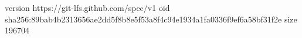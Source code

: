 version https://git-lfs.github.com/spec/v1
oid sha256:89bab4b2313656ae2dd5f8b8e5f53a8f4c94e1934a1fa0336f9ef6a58bf31f2e
size 196704
